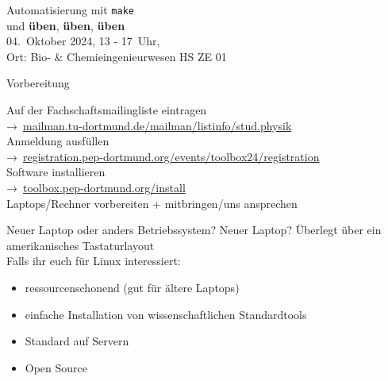 \begin{frame}
  \begin{center}
    \huge Automatisierung mit \texttt{make}\\[0.5\baselineskip]
    und \textbf{üben}, \textbf{üben}, \textbf{üben}\\[0.5\baselineskip]
    04.~Oktober 2024, 13 - 17~Uhr,\\
    Ort: Bio- \& Chemieingenieurwesen HS ZE 01
  \end{center}
\end{frame}

\begin{frame}{Vorbereitung}
  \begin{center}
    \huge
    Auf der Fachschaftsmailingliste eintragen \\
    →~\href{https://mailman.tu-dortmund.de/mailman/listinfo/stud.physik}{mailman.tu-dortmund.de/mailman/listinfo/stud.physik}\\[0.5\baselineskip]
    Anmeldung ausfüllen\\
    →~\textcolor{blue!70!black}{\href{https://registration.pep-dortmund.org/events/toolbox24/registration/}{registration.pep-dortmund.org/events/toolbox24/registration}}\\[0.5\baselineskip]
    Software installieren\\
    →~\textcolor{blue!70!black}{\href{https://toolbox.pep-dortmund.org/install/install/}{toolbox.pep-dortmund.org/install}}\\[0.5\baselineskip]
    Laptops/Rechner vorbereiten + mitbringen/uns ansprechen
  \end{center}
\end{frame}
\begin{frame}{Neuer Laptop oder anders Betriebssystem?}
  \huge
  Neuer Laptop? Überlegt über ein amerikanisches Tastaturlayout\\[0.5\baselineskip]

  Falls ihr euch für Linux interessiert:
	\begin{itemize}
		\item ressourcenschonend (gut für ältere Laptops)
		\item einfache Installation von wissenschaftlichen Standardtools
		\item Standard auf Servern
		\item Open Source
	\end{itemize}
\end{frame}
